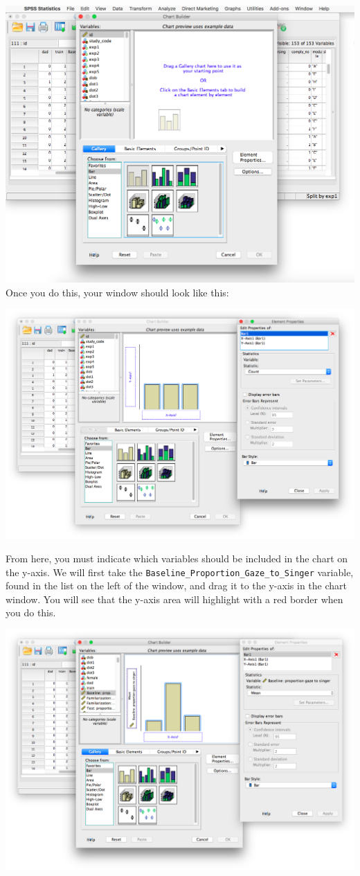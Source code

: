 \documentclass[
]{book}
\begin{document}
\includegraphics{img/6.4.22.png}
Once you do this, your window should look like this:

\includegraphics{img/6.4.23.png}

From here, you must indicate which variables should be included in the chart on the y-axis. We will first take the \texttt{Baseline\_Proportion\_Gaze\_to\_Singer} variable, found in the list on the left of the window, and drag it to the y-axis in the chart window. You will see that the y-axis area will highlight with a red border when you do this.

\includegraphics{img/6.4.24.png}
\end{document}

